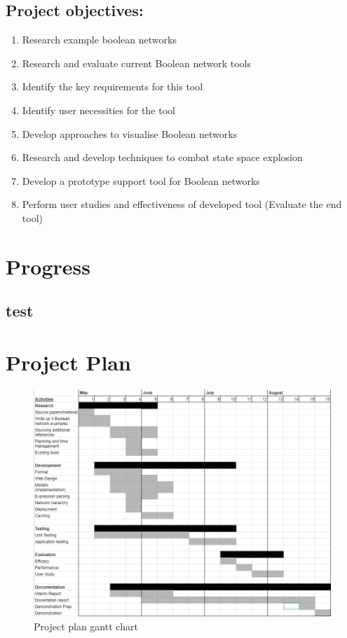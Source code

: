 \documentclass[12pt, letterpaper]{article}
\begin{document}
    \subsection{Project objectives:}
    \begin{enumerate}[noitemsep]
      \item Research example boolean networks
      \item Research and evaluate current Boolean network tools
      \item Identify the key requirements for this tool 
      \item Identify user necessities for the tool
      \item Develop approaches to visualise Boolean networks
      \item Research and develop techniques to combat state space explosion
      \item Develop a prototype support tool for Boolean networks
      \item Perform user studies and effectiveness of developed tool (Evaluate the end tool)  
    \end{enumerate}

  \section{Progress}

  \subsection{test}

  \newpage

  \section{Project Plan}

  \begin{figure}[H]
    \begin{center}
      \includegraphics[scale=0.5]{Chart.png}
    \end{center}
    \caption{Project plan gantt chart}
    \label{fig:BoolNet}
  \end{figure}

  \newpage

  
  
\end{document}
